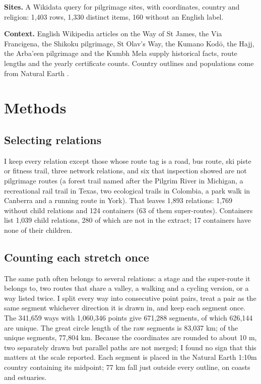 \documentclass[11pt,a4paper]{article}
\begin{document}
\textbf{Sites.} A Wikidata query for pilgrimage sites, with coordinates, country and religion: 1,403 rows, 1,330 distinct items, 160 without an English label.

\textbf{Context.} English Wikipedia articles on the Way of St James, the Via Francigena, the Shikoku pilgrimage, St Olav's Way, the Kumano Kodō, the Hajj, the Arba'een pilgrimage and the Kumbh Mela \citep{wikicamino,wikivf,wikishikoku,wikiolav,wikikumano,wikihajj,wikiarbaeen,wikikumbh} supply historical facts, route lengths and the yearly certificate counts. Country outlines and populations come from Natural Earth \citep{naturalearth}.

\section{Methods}
\subsection{Selecting relations}
I keep every relation except those whose route tag is a road, bus route, ski piste or fitness trail, three network relations, and six that inspection showed are not pilgrimage routes (a forest trail named after the Pilgrim River in Michigan, a recreational rail trail in Texas, two ecological trails in Colombia, a park walk in Canberra and a running route in York). That leaves 1,893 relations: 1,769 without child relations and 124 containers (63 of them super-routes). Containers list 1,039 child relations, 280 of which are not in the extract; 17 containers have none of their children.

\subsection{Counting each stretch once}
The same path often belongs to several relations: a stage and the super-route it belongs to, two routes that share a valley, a walking and a cycling version, or a way listed twice. I split every way into consecutive point pairs, treat a pair as the same segment whichever direction it is drawn in, and keep each segment once. The 341,659 ways with 1,060,346 points give 671,288 segments, of which 626,144 are unique. The great circle length of the raw segments is 83,037 km; of the unique segments, 77,804 km. Because the coordinates are rounded to about 10 m, two separately drawn but parallel paths are not merged; I found no sign that this matters at the scale reported. Each segment is placed in the Natural Earth 1:10m country containing its midpoint; 77 km fall just outside every outline, on coasts and estuaries.
\end{document}
